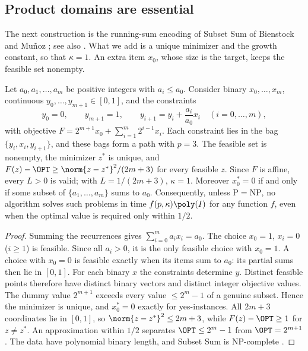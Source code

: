 \subsection{Product domains are essential}\label{sec:limits-constraints}

The next construction is the running-sum encoding of Subset Sum of Bienstock
and Mu\~noz \cite{BienstockMunoz2018}; see also
\cite[Example~1.1]{CifuentesParrilo2016}. What we add is a unique minimizer
and the growth constant, so that $\kappa=1$. An extra item $x_0$, whose size
is the target, keeps the feasible set nonempty.

\begin{proposition}\label{lim:prop:constraints}
Let $a_0,a_1,\ldots,a_m$ be positive integers with $a_i\le a_0$. Consider
binary $x_0,\ldots,x_m$, continuous $y_0,\ldots,y_{m+1}\in[0,1]$, and the
constraints
\[
y_0=0,\qquad y_{m+1}=1,\qquad y_{i+1}=y_i+\frac{a_i}{a_0}x_i\quad(i=0,\ldots,m),
\]
with objective $F=2^{m+1}x_0+\sum_{i=1}^m2^{i-1}x_i$. Each constraint lies in
the bag $\{y_i,x_i,y_{i+1}\}$, and these bags form a path with $p=3$. The
feasible set is nonempty, the minimizer $z^*$ is unique, and
$F(z)-\OPT\ge\norm{z-z^*}^2/(2m+3)$ for every feasible $z$. Since $F$ is
affine, every $L>0$ is valid; with $L=1/(2m+3)$, $\kappa=1$. Moreover
$x_0^*=0$ if and only if some subset of $\{a_1,\ldots,a_m\}$ sums to $a_0$.
Consequently, unless $\mathrm P=\mathrm{NP}$, no algorithm solves such
problems in time $f(p,\kappa)\poly(I)$ for any function $f$, even when the
optimal value is required only within $1/2$.
\end{proposition}

\begin{proof}
Summing the recurrences gives $\sum_{i=0}^ma_ix_i=a_0$. The choice $x_0=1$,
$x_i=0$ ($i\ge1$) is feasible. Since all $a_i>0$, it is the only feasible
choice with $x_0=1$. A choice with $x_0=0$ is feasible exactly when its
items sum to $a_0$: its partial sums then lie in $[0,1]$. For each binary $x$
the constraints determine $y$. Distinct feasible points therefore have
distinct binary vectors and distinct integer objective values. The dummy
value $2^{m+1}$ exceeds every value $\le2^m-1$ of a genuine subset. Hence
the minimizer is unique, and $x_0^*=0$ exactly for yes-instances. All
$2m+3$ coordinates lie in $[0,1]$, so $\norm{z-z^*}^2\le2m+3$, while
$F(z)-\OPT\ge1$ for $z\ne z^*$. An approximation within $1/2$ separates
$\OPT\le2^m-1$ from $\OPT=2^{m+1}$. The data have polynomial binary length,
and Subset Sum is NP-complete \cite{GareyJohnson1979}.
\end{proof}

